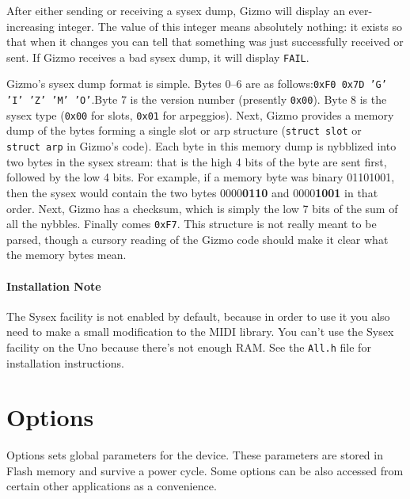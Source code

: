 \documentclass{article}
\begin{document}
After either sending or receiving a sysex dump, Gizmo will display an ever-increasing integer.  The value of this integer means absolutely nothing: it exists so that when it changes you can tell that something was just successfully received or sent.  If Gizmo receives a bad sysex dump, it will display \texttt{FAIL}.

Gizmo's sysex dump format is simple.  Bytes 0--6 are as follows:\quad\texttt{0xF0 0x7D 'G' 'I' 'Z' 'M' 'O'}.\quad  Byte 7 is the version number (presently \texttt{0x00}). Byte 8 is the sysex type (\texttt{0x00} for slots, \texttt{0x01} for arpeggios).  Next, Gizmo provides a memory dump of the bytes forming a single slot or arp structure (\texttt{struct~{\textunderscore}slot} or \texttt{struct~{\textunderscore}arp} in Gizmo's code).  Each byte in this memory dump is nybblized into two bytes in the sysex stream: that is the high 4 bits of the byte are sent first, followed by the low 4 bits.  For example, if a memory byte was binary 01101001, then the sysex would contain the two bytes 0000{\bf 0110} and 0000{\bf 1001} in that order.  Next, Gizmo has a checksum, which is simply the low 7 bits of the sum of all the nybbles.  Finally comes \texttt{0xF7}.   This structure is not really meant to be parsed, though a cursory reading of the Gizmo code should make it clear what the memory bytes mean.

\paragraph{Installation Note} The Sysex facility is not enabled by default, because in order to use it you also need to make a small modification to the MIDI library.  You can't use the Sysex facility on the Uno because there's not enough RAM.  See the {\tt All.h} file for installation instructions.

\clearpage
\section {Options}
\label{options}

	Options sets global parameters for the device.  These parameters are stored in Flash memory and survive a power cycle.  Some options can be also accessed from certain other applications as a convenience.  
	
\end{document}
